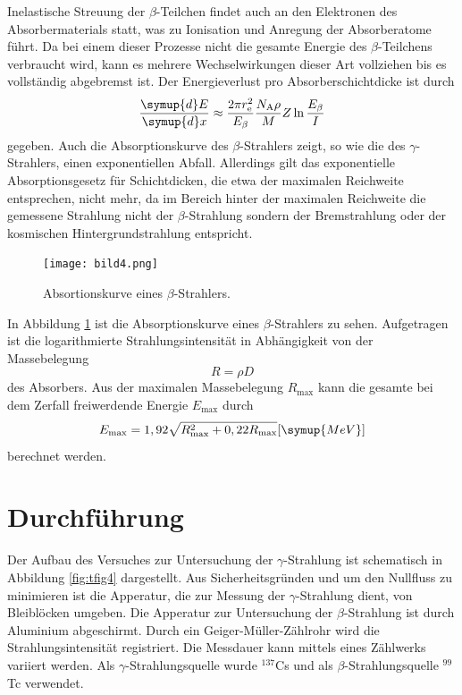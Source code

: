Inelastische Streuung der $\beta$-Teilchen findet auch an den Elektronen des Absorbermaterials statt, was zu Ionisation und Anregung der Absorberatome führt.
Da bei einem dieser Prozesse nicht die gesamte Energie des $\beta$-Teilchens verbraucht wird, kann es mehrere Wechselwirkungen dieser Art vollziehen bis es vollständig abgebremst ist.
Der Energieverlust pro Absorberschichtdicke ist durch
\begin{equation}
\frac{\symup{d}E}{\symup{d}x}\approx \frac{2\pi r_{\text{e}}^2}{E_{\beta}}\frac{N_{\text{A}}\rho}{M}Z\ln{\frac{E_{\beta}}{I}}
\end{equation}
gegeben.
Auch die Absorptionskurve des $\beta$-Strahlers zeigt, so wie die des $\gamma$-Strahlers, einen exponentiellen Abfall. Allerdings gilt das exponentielle Absorptionsgesetz für
Schichtdicken, die etwa der maximalen Reichweite entsprechen, nicht mehr, da im Bereich hinter der maximalen Reichweite die gemessene Strahlung nicht der $\beta$-Strahlung sondern
der Bremstrahlung oder der kosmischen Hintergrundstrahlung entspricht. 

\FloatBarrier
\begin{figure}[h]
    \centering
    \texttt{[image: bild4.png]}
    \caption{Absortionskurve eines $\beta$-Strahlers. \cite{quelle01}}
    \label{fig:tfig3}
\end{figure}
\FloatBarrier
\noindent
In Abbildung \ref{fig:tfig3} ist die Absorptionskurve eines $\beta$-Strahlers zu sehen. Aufgetragen ist die logarithmierte Strahlungsintensität in Abhängigkeit von der Massebelegung
\begin{equation}
R=\rho D
\end{equation}
des Absorbers. Aus der maximalen Massebelegung 
$R_{\text{max}}$ kann die gesamte bei dem Zerfall freiwerdende Energie $E_{\text{max}}$ durch
\begin{equation}
    \label{eq:emax}
E_{\text{max}}=1,92\sqrt{R_{\text{max}}^2+0,22R_{\text{max}}} [\symup{MeV}]
\end{equation}
berechnet werden.


\section{Durchführung}
Der Aufbau des Versuches zur Untersuchung der $\gamma$-Strahlung ist schematisch in Abbildung \ref{fig:tfig4} dargestellt.
Aus Sicherheitsgründen und um den Nullfluss zu minimieren ist die Apperatur, die zur Messung der $\gamma$-Strahlung dient, 
von Bleiblöcken umgeben. Die Apperatur zur Untersuchung der $\beta$-Strahlung ist durch Aluminium abgeschirmt. 
Durch ein Geiger-Müller-Zählrohr wird die Strahlungsintensität
registriert. Die Messdauer kann mittels eines Zählwerks variiert werden.
Als $\gamma$-Strahlungsquelle wurde $^{137}$Cs und als $\beta$-Strahlungsquelle $^{99}$Tc verwendet.

